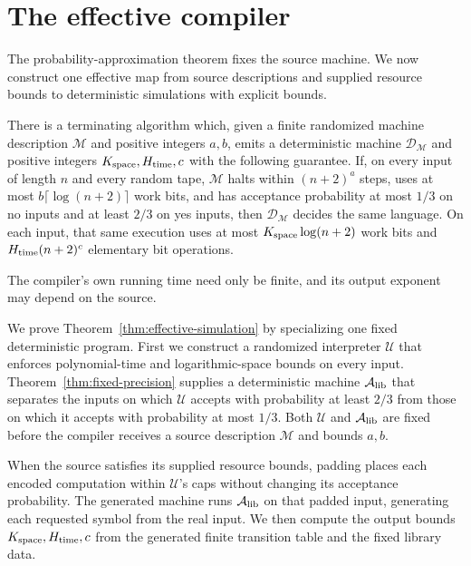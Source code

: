 \section{The effective compiler}
\label{sec:compiler}

The probability-approximation theorem fixes the source machine. We now
construct one effective map from source descriptions and supplied
resource bounds to deterministic simulations with explicit bounds.

\begin{theorem}
\label{thm:effective-simulation}
There is a terminating algorithm which, given a finite randomized machine
description ${\mathcal M}$ and positive integers $a,b$, emits a deterministic
machine $\mathcal D_{\mathcal M}$ and positive integers ${K_{\rm space}},{H_{\rm time}},c$ with the following guarantee.
If, on every input of length $n$ and every random tape, ${\mathcal M}$ halts within
$(n+2)^a$ steps, uses at most $b\lceil\log(n+2)\rceil$ work bits, and
has acceptance probability at most $1/3$ on no inputs and at least
$2/3$ on yes inputs, then $\mathcal D_{\mathcal M}$ decides the same language. On each input,
that same execution uses at most ${K_{\rm space}}\log(n+2)$ work bits and
${H_{\rm time}}(n+2)^c$ elementary bit operations.
\end{theorem}

The compiler's own running time need only be finite, and its output
exponent may depend on the source.

We prove Theorem~\ref{thm:effective-simulation} by specializing one
fixed deterministic program. First we construct a randomized interpreter
${\mathcal U}$ that enforces polynomial-time and logarithmic-space bounds on every
input. Theorem~\ref{thm:fixed-precision} supplies a deterministic machine
${\mathcal A_{\rm lib}}$ that separates the inputs on which ${\mathcal U}$ accepts with probability at
least $2/3$ from those on which it accepts with probability at most
$1/3$. Both ${\mathcal U}$ and ${\mathcal A_{\rm lib}}$ are fixed before the compiler receives a source
description ${\mathcal M}$ and bounds $a,b$.

When the source satisfies its supplied resource bounds, padding places
each encoded computation within ${\mathcal U}$'s caps without changing its
acceptance probability. The generated machine runs ${\mathcal A_{\rm lib}}$ on that padded input, generating each requested
symbol from the real input. We then compute the output bounds ${K_{\rm space}},{H_{\rm time}},c$
from the generated finite transition table and the fixed library data.

